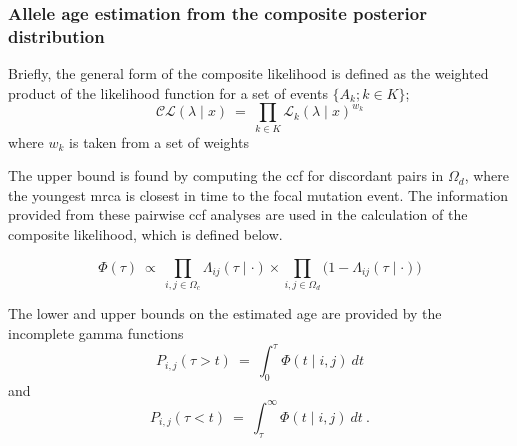 %


%
\subsubsection{Allele age estimation from the composite posterior distribution}\label{sec:comp_post_detail}
%



Briefly, the general form of the composite likelihood is defined as the weighted product of the likelihood function for a set of events ${\{A_k;k \in K\}}$; \ie
\begin{equation}
	\mathcal{C\!L}(\lambda\mid x)~=~\prod_{k\in K} \mathcal{L}_k(\lambda\mid x)^{w_k}
\end{equation}
where
$w_k$ is taken from a set of weights

The upper bound is found by computing the \gls{ccf} for discordant pairs in $\Omega_d$, where the youngest \gls{mrca} is closest in time to the focal mutation event.
The information provided from these pairwise \gls{ccf} analyses are used in the calculation of the composite likelihood, which is defined below.



\begin{equation}\label{eq:compll}
	\Phi(\tau)
	~\propto~
	\prod_{i,j \in \Omega_c} \Lambda_{ij}(\tau\mid\cdot)
	\times
	\prod_{i,j \in \Omega_d} \big(1 - \Lambda_{ij}(\tau\mid\cdot) \big)
\end{equation}

The lower and upper bounds on the estimated age are provided by the incomplete gamma functions
\begin{equation}
	P_{i,j}(\tau > t) ~=~ \int_{0}^{\tau} \Phi(t \mid i,j) ~dt
\end{equation}
and
\begin{equation}
	P_{i,j}(\tau < t) ~=~ \int_{\tau}^{\infty} \Phi(t \mid i,j) ~dt \ .
\end{equation}

